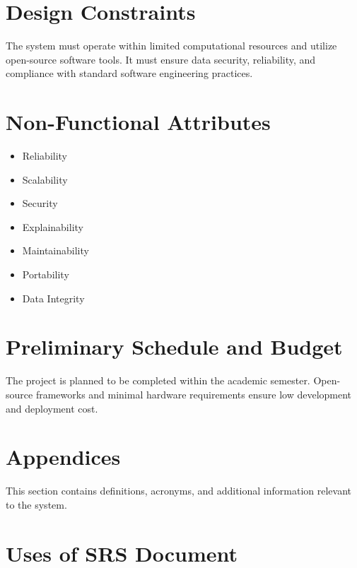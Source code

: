 \documentclass[12pt,a4paper]{article}
\begin{document}
\section{Design Constraints}

The system must operate within limited computational resources and utilize open-source software tools. It must ensure data security, reliability, and compliance with standard software engineering practices.

\section{Non-Functional Attributes}

\begin{itemize}
    \item Reliability
    \item Scalability
    \item Security
    \item Explainability
    \item Maintainability
    \item Portability
    \item Data Integrity
\end{itemize}

\section{Preliminary Schedule and Budget}

The project is planned to be completed within the academic semester. Open-source frameworks and minimal hardware requirements ensure low development and deployment cost.

\section{Appendices}

This section contains definitions, acronyms, and additional information relevant to the system.

\section{Uses of SRS Document}
\end{document}
